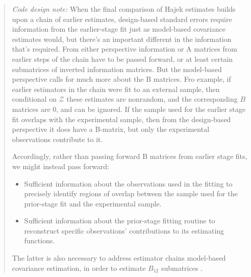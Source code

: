 \begin{quote}
  \textit{Code design note:}
  When the final comparison of Hajek estimates builds upon a chain of
  earlier estimates, design-based standard errors require information
  from the earlier-stage fit just as model-based covariance estimates
  would, but there's an important different in the information that's
  required. From either perspective  information or A matrices from
  earlier steps of the chain have to be passed forward, or at least
  certain submatrices of inverted information matrices.  But the
  model-based perspective calls for much more about the B matrices.
  Fro example, if earlier estimators in the chain were fit to an
  external sample, then conditional on $\mathcal{Z}$ these estimates
  are nonrandom, and the corresponding $B$ matrices are 0, and can be
  ignored.  If the sample used for the earlier stage fit overlaps with
  the experimental sample, then from the design-based perspective it
  does have a B-matrix, but only the experimental observations
  contribute to it.

  Accordingly, rather than passing forward B matrices from earlier
  stage fits, we might instead pass forward:
  \begin{itemize}
  \item Sufficient information about the observations used in the
    fitting to precisely identify regions of overlap between the
    sample used for the prior-stage fit and the experimental sample.  
  \item Sufficient information about the prior-stage fitting routine
    to reconstruct specific observations' contributions to its estimating functions.
  \end{itemize}
The latter is also necessary to address estimator chains model-based
covariance estimation, in order to estimate $B_{12}$ submatrices
\citep[p.373]{carroll2006measurement}.
\end{quote}

